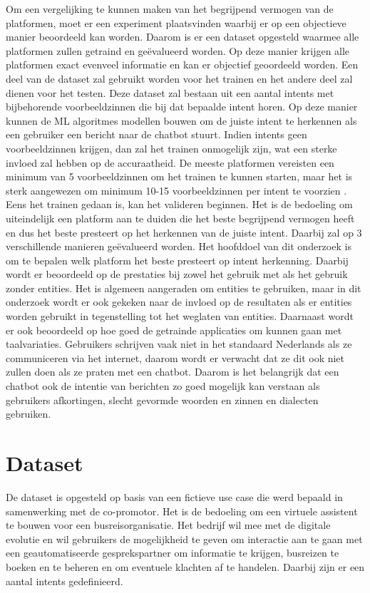 Om een vergelijking te kunnen maken van het begrijpend vermogen van de platformen, moet er een experiment plaatsvinden waarbij er op een objectieve manier beoordeeld kan worden. Daarom is er een dataset opgesteld waarmee alle platformen zullen getraind en geëvalueerd worden. Op deze manier krijgen alle platformen exact evenveel informatie en kan er objectief geoordeeld worden. Een deel van de dataset zal gebruikt worden voor het trainen en het andere deel zal dienen voor het testen. Deze dataset zal bestaan uit een aantal intents met bijbehorende voorbeeldzinnen die bij dat bepaalde intent horen. Op deze manier kunnen de ML algoritmes modellen bouwen om de juiste intent te herkennen als een gebruiker een bericht naar de chatbot stuurt. Indien intents geen voorbeeldzinnen krijgen, dan zal het trainen onmogelijk zijn, wat een sterke invloed zal hebben op de accuraatheid. De meeste platformen vereisten een minimum van 5 voorbeeldzinnen om het trainen te kunnen starten, maar het is sterk aangewezen om minimum 10-15 voorbeeldzinnen per intent te voorzien \autocite{Greyling2019}. Eens het trainen gedaan is, kan het valideren beginnen. Het is de bedoeling om uiteindelijk een platform aan te duiden die het beste begrijpend vermogen heeft en dus het beste presteert op het herkennen van de juiste intent. Daarbij zal op 3 verschillende manieren geëvalueerd worden. Het hoofddoel van dit onderzoek is om te bepalen welk platform het beste presteert op intent herkenning. Daarbij wordt er beoordeeld op de prestaties bij zowel het gebruik met als het gebruik zonder entities. Het is algemeen aangeraden om entities te gebruiken, maar in dit onderzoek wordt er ook gekeken naar de invloed op de resultaten als er entities worden gebruikt in tegenstelling tot het weglaten van entities. Daarnaast wordt er ook beoordeeld op hoe goed de getrainde applicaties om kunnen gaan met taalvariaties. Gebruikers schrijven vaak niet in het standaard Nederlands als ze communiceren via het internet, daarom wordt er verwacht dat ze dit ook niet zullen doen als ze praten met een chatbot. Daarom is het belangrijk dat een chatbot ook de intentie van berichten zo goed mogelijk kan verstaan als gebruikers afkortingen, slecht gevormde woorden en zinnen en dialecten gebruiken.

\section{Dataset}
\label{sec:dataset}

De dataset is opgesteld op basis van een fictieve use case die werd bepaald in samenwerking met de co-promotor. Het is de bedoeling om een virtuele assistent te bouwen voor een busreisorganisatie. Het bedrijf wil mee met de digitale evolutie en wil gebruikers de mogelijkheid te geven om interactie aan te gaan met een geautomatiseerde gesprekspartner om informatie te krijgen, busreizen te boeken en te beheren en om eventuele klachten af te handelen. Daarbij zijn er een aantal intents gedefinieerd.

